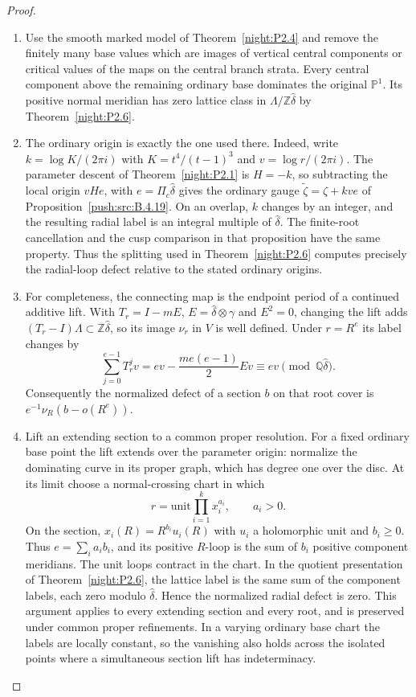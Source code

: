 \begin{proof}
\begin{enumerate}[label=\arabic*.,leftmargin=*]
\item Use the smooth marked model of Theorem~\ref{night:P2.4} and remove the finitely many base values which are images of vertical central components or critical values of the maps on the central branch strata. Every central component above the remaining ordinary base dominates the original $\mathbb P^1$. Its positive normal meridian has zero lattice class in $\Lambda/\mathbb Z\widehat\delta$ by Theorem~\ref{night:P2.6}.

\item The ordinary origin is exactly the one used there. Indeed, write $k=\log K/(2\pi i)$ with $K=t^4/(t-1)^3$ and $v=\log r/(2\pi i)$. The parameter descent of Theorem~\ref{night:P2.1} is $H=-k$, so subtracting the local origin $vHe$, with $e=\Pi_c\widehat\delta$ gives the ordinary gauge $\widetilde\zeta=\zeta+kv e$ of Proposition~\ref{push:src:B.4.19}. On an overlap, $k$ changes by an integer, and the resulting radial label is an integral multiple of $\widehat\delta$. The finite-root cancellation and the cusp comparison in that proposition have the same property. Thus the splitting used in Theorem~\ref{night:P2.6} computes precisely the radial-loop defect relative to the stated ordinary origins.

\item For completeness, the connecting map is the endpoint period of a continued additive lift. With $T_r=I-mE$, $E=\widehat\delta\otimes\gamma$ and $E^2=0$, changing the lift adds $(T_r-I)\Lambda\subset\mathbb Z\widehat\delta$, so its image $\nu_r$ in $V$ is well defined. Under $r=R^e$ its label changes by
\[
 \sum_{j=0}^{e-1}T_r^jv
 =ev-\frac{me(e-1)}2Ev
 \equiv ev\pmod{\mathbb Q\widehat\delta}.
\]
Consequently the normalized defect of a section $b$ on that root cover is $e^{-1}\nu_R(b-o(R^e))$.

\item Lift an extending section to a common proper resolution. For a fixed ordinary base point the lift extends over the parameter origin: normalize the dominating curve in its proper graph, which has degree one over the disc. At its limit choose a normal-crossing chart in which
\[
 r=\text{unit}\prod_{i=1}^k x_i^{a_i},\qquad a_i>0.
\]
On the section, $x_i(R)=R^{b_i}u_i(R)$ with $u_i$ a holomorphic unit and $b_i\ge0$. Thus $e=\sum_i a_i b_i$, and its positive $R$-loop is the sum of $b_i$ positive component meridians. The unit loops contract in the chart. In the quotient presentation of Theorem~\ref{night:P2.6}, the lattice label is the same sum of the component labels, each zero modulo $\widehat\delta$. Hence the normalized radial defect is zero. This argument applies to every extending section and every root, and is preserved under common proper refinements. In a varying ordinary base chart the labels are locally constant, so the vanishing also holds across the isolated points where a simultaneous section lift has indeterminacy.


\end{enumerate}
\end{proof}
